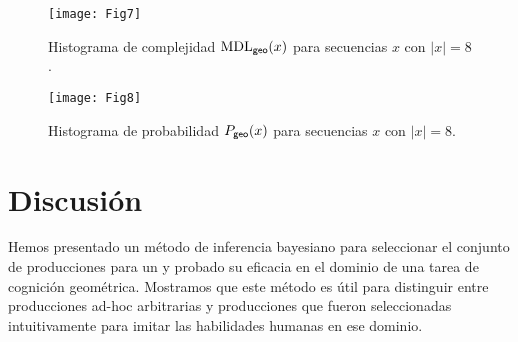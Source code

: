 \begin{figure}[!ht]
    \centering
    \texttt{[image: Fig7]}
    \caption{Histograma de complejidad ${\rm MDL}_{{\sf geo}}(x)$ para secuencias $x$ con $|x| = 8$.}
    \label{fig:codK:8}
\end{figure}


\begin{figure}[!ht]
    \centering
    \texttt{[image: Fig8]}
    \caption{Histograma de probabilidad $P_{{\sf geo}}(x)$ para secuencias $x$ con $|x| = 8$.}
    \label{fig:codP:8}
\end{figure}

\section{Discusión}


Hemos presentado un método de inferencia bayesiano para seleccionar el conjunto de producciones para un \lot y probado su eficacia en el dominio de una tarea de cognición geométrica. Mostramos que este método es útil para distinguir entre producciones ad-hoc arbitrarias y producciones que fueron seleccionadas intuitivamente para imitar las habilidades humanas en ese dominio.


